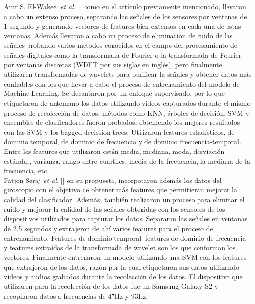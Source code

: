 Amr S. El-Wakeel {\it et al.} [] como en el artículo previamente mencionado, llevaron a cabo un extenso proceso, separando las señales de los sensores por
ventanas de 1 segundo y generando vectores de features bien extensos en cada una de estas ventanas. Además llevaron a cabo un proceso de eliminación de ruido
de las señales probando varios métodos conocidos en el campo del procesamiento de señales digitales como la transformada de Fourier o la transformada de
Fourier por ventanas discretas (WDFT por sus siglas en inglés), pero finalmente utilizaron transformadas de wavelets para purificar la señales y obtener
datos más confiables con los que llevar a cabo el proceso de entrenamiento del modelo de Machine Learning. Se decantaron por un enfoque supervisado, por lo que 
etiquetaron de antemano los datos utilizando vídeos capturados durante el mismo proceso de recolección de datos, métodos como KNN, árboles de decisión, SVM y
ensembles de clasificadores fueron probados, obteniendo los mejores resultados con las SVM y los bagged decission trees. Utilizaron features estadísticos, de
dominio temporal, de dominio de frecuencia y de dominio frecuencia-temporal. Entre los features que utilizaron están media, mediana, moda, desviación estándar,
varianza, rango entre cuartiles, media de la frecuencia, la mediana de la frecuencia, etc.\\

Fatjon Seraj {\it et al.} [] en su propuesta, incorporaron además los datos del giroscopio con el objetivo de obtener más features que permitieran mejorar la calidad
del clasificador. Además, también realizaron un proceso para eliminar el ruido y mejorar la calidad de las señales obtenidas con los sensores de los dispositivos
utilizados para capturar los datos. Separaron las señales en ventanas de 2.5 segundos y extrajeron de ahí varios features para el proceso de entrenamiento. Features
de dominio temporal, features de dominio de frecuencia y features extraídos de la transformada de wavelet son los que conforman los vectores. Finalmente entrenaron
un modelo utilizando una SVM con los features que extrajeron de los datos, razón por la cual etiquetaron sus datos utilizando vídeos y audios grabados durante la
recolección de los datos. El dispositivo que utilizaron para la recolección de los datos fue un Samsung Galaxy S2 y recopilaron datos a frecuencias de 47Hz y 93Hz.\\



